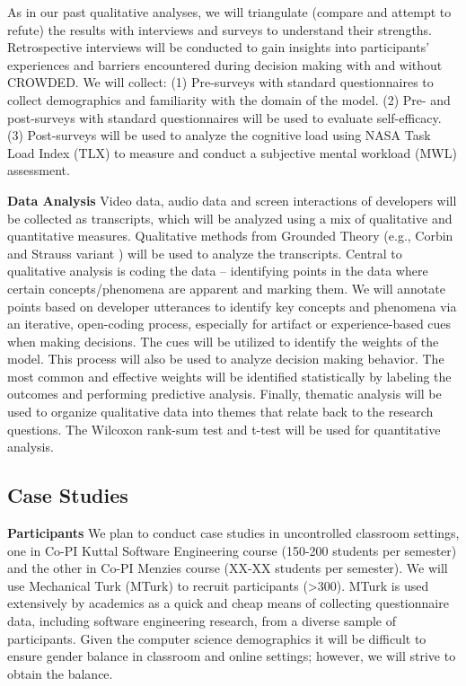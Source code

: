 As in our past qualitative analyses, we will triangulate (compare and attempt to refute) the results with interviews and surveys to understand their strengths. Retrospective interviews will be conducted to gain insights into participants' experiences and barriers encountered during decision making with and without CROWDED. We will collect: (1) Pre-surveys with standard questionnaires to collect demographics and familiarity with the domain of the model. (2) Pre- and post-surveys with standard questionnaires will be used to evaluate self-efficacy. (3) Post-surveys will be used to analyze the cognitive load using NASA Task Load Index (TLX) to measure and conduct a subjective mental workload (MWL) assessment. 

\textbf{Data Analysis} Video data, audio data and screen interactions of developers will be collected as transcripts, which will be analyzed using a mix of qualitative and quantitative measures. Qualitative methods from Grounded Theory \cite{GlaStr67} (e.g., Corbin and Strauss variant \cite{strauss_basics_1998}) will be used to analyze the transcripts. Central to qualitative analysis is coding the data – identifying points in the data where certain concepts/phenomena are apparent and marking them. We will annotate points based on developer utterances to identify key concepts and phenomena via an iterative, open-coding process, especially for artifact or experience-based cues when making decisions. The cues will be utilized to identify the weights of the model. This process will also be used to analyze decision making behavior. The most common and effective weights will be identified statistically by labeling the outcomes and performing predictive analysis. Finally, thematic analysis \cite{Braun2006} will be used to organize qualitative data into themes that relate back to the research questions.  The Wilcoxon rank-sum test and t-test will be used for quantitative analysis.

\subsection{Case Studies}
\textbf{Participants} We plan to conduct case studies in uncontrolled classroom settings, one in Co-PI Kuttal Software Engineering course (150-200 students per semester) and the other in Co-PI Menzies course (XX-XX students per semester). We will use Mechanical Turk (MTurk) to recruit participants (>300). MTurk is used extensively by academics as a quick and cheap means of collecting questionnaire data, including software engineering research, from a diverse sample of participants. Given the computer science demographics it will be difficult to ensure gender balance in classroom and online settings; however, we will strive to obtain the balance.

